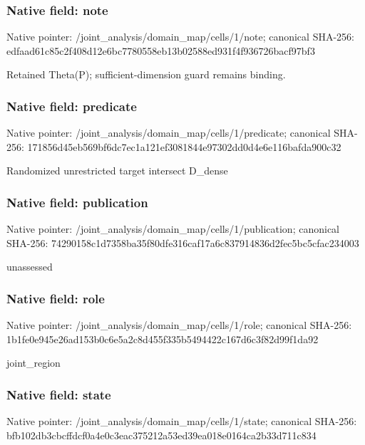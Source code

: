 \documentclass[10pt,a4paper]{article}
\begin{document}
\subsubsection{Native field: note}
Native pointer: /joint\_\allowbreak{}analysis/domain\_\allowbreak{}map/cells/1/note; canonical SHA-256: edfaad61c85c2f408d12e6bc7780558eb13b02588ed931f4f936726bacf97bf3

\begingroup\raggedright\sloppy Retained Theta(P);\allowbreak{} sufficient-dimension guard remains binding.\par\endgroup

\subsubsection{Native field: predicate}
Native pointer: /joint\_\allowbreak{}analysis/domain\_\allowbreak{}map/cells/1/predicate; canonical SHA-256: 171856d45eb569bf6dc7ec1a121ef3081844e97302dd0d4e6e116bafda900c32

\begingroup\raggedright\sloppy Randomized unrestricted target intersect D\_\allowbreak{}dense\par\endgroup

\subsubsection{Native field: publication}
Native pointer: /joint\_\allowbreak{}analysis/domain\_\allowbreak{}map/cells/1/publication; canonical SHA-256: 74290158c1d7358ba35f80dfe316caf17a6c837914836d2fec5bc5cfac234003

\begingroup\raggedright\sloppy unassessed\par\endgroup

\subsubsection{Native field: role}
Native pointer: /joint\_\allowbreak{}analysis/domain\_\allowbreak{}map/cells/1/role; canonical SHA-256: 1b1fe0e945e26ad153b0c6e5a2c8d455f335b5494422c167d6c3f82d99f1da92

\begingroup\raggedright\sloppy joint\_\allowbreak{}region\par\endgroup

\subsubsection{Native field: state}
Native pointer: /joint\_\allowbreak{}analysis/domain\_\allowbreak{}map/cells/1/state; canonical SHA-256: bfb102db3cbcffdcf0a4e0c3eac375212a53ed39ea018e0164ca2b33d711c834
\end{document}
